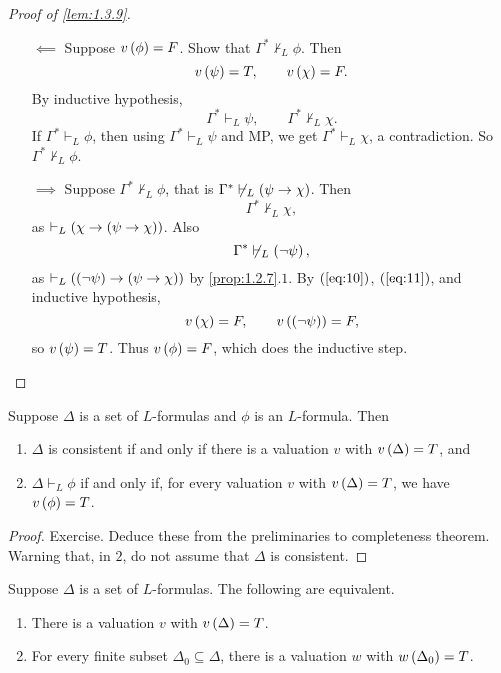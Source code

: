 \begin{proof}[Proof of \ref{lem:1.3.9}]
\begin{itemize}
\begin{enumerate}[leftmargin=0.5in, label=Case \arabic*.]
\begin{itemize}
\item[$ \impliedby $] Suppose $ v\left( \phi \right) = F $. Show that $ \Gamma^* \not\vdash_L \phi $. Then
$$ v\left( \psi \right) = T, \qquad v\left( \chi \right) = F. $$
By inductive hypothesis,
$$ \Gamma^* \vdash_L \psi, \qquad \Gamma^* \not\vdash_L \chi. $$
If $ \Gamma^* \vdash_L \phi $, then using $ \Gamma^* \vdash_L \psi $ and MP, we get $ \Gamma^* \vdash_L \chi $, a contradiction. So $ \Gamma^* \not\vdash_L \phi $.
\item[$ \implies $] Suppose $ \Gamma^* \not\vdash_L \phi $, that is $ \Gamma^* \not\vdash_L \left( \psi \rightarrow \chi \right) $. Then
\begin{equation}
\label{eq:10}
\Gamma^* \not\vdash_L \chi,
\end{equation}
as $ \vdash_L \left( \chi \rightarrow \left( \psi \rightarrow \chi \right) \right) $. Also
\begin{equation}
\label{eq:11}
\Gamma^* \not\vdash_L \left( \neg \psi \right),
\end{equation}
as $ \vdash_L \left( \left( \neg \psi \right) \rightarrow \left( \psi \rightarrow \chi \right) \right) $ by \ref{prop:1.2.7}.$ 1 $. By $ \left( \ref{eq:10} \right) $, $ \left( \ref{eq:11} \right) $, and inductive hypothesis,
$$ v\left( \chi \right) = F, \qquad v\left( \left( \neg \psi \right) \right) = F, $$
so $ v\left( \psi \right) = T $. Thus $ v\left( \phi \right) = F $, which does the inductive step.
\end{itemize}
\end{enumerate}
\end{itemize}
\end{proof}

\begin{corollary}
\label{cor:1.3.11}
Suppose $ \Delta $ is a set of $ L $-formulas and $ \phi $ is an $ L $-formula. Then
\begin{enumerate}
\item $ \Delta $ is consistent if and only if there is a valuation $ v $ with $ v\left( \Delta \right) = T $, and
\item $ \Delta \vdash_L \phi $ if and only if, for every valuation $ v $ with $ v\left( \Delta \right) = T $, we have $ v\left( \phi \right) = T $.
\end{enumerate}
\end{corollary}

\begin{proof}
Exercise. Deduce these from the preliminaries to completeness theorem. Warning that, in $ 2 $, do not assume that $ \Delta $ is consistent.
\end{proof}

\begin{theorem}
Suppose $ \Delta $ is a set of $ L $-formulas. The following are equivalent.
\begin{enumerate}
\item There is a valuation $ v $ with $ v\left( \Delta \right) = T $.
\item For every finite subset $ \Delta_0 \subseteq \Delta $, there is a valuation $ w $ with $ w\left( \Delta_0 \right) = T $.
\end{enumerate}
\end{theorem}

